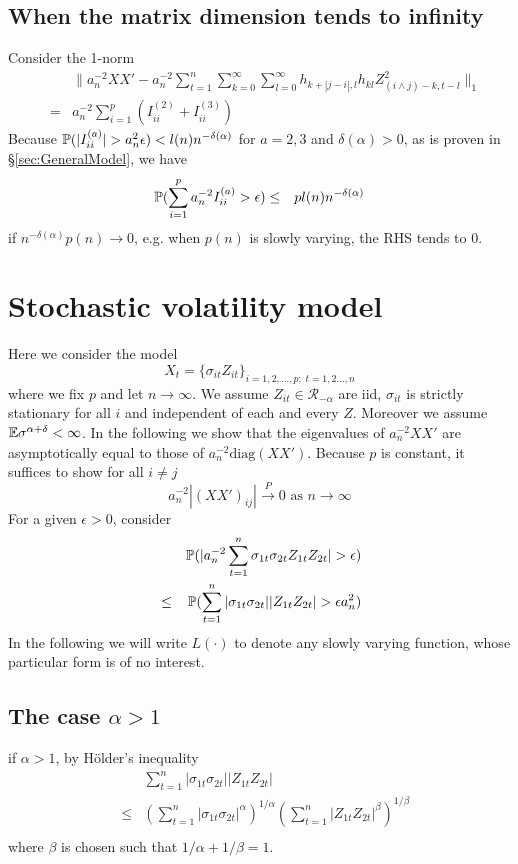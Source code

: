 \documentclass{article}
\begin{document}
\subsection{When the matrix dimension tends to infinity}
Consider the 1-norm
\begin{eqnarray*}
  && \| a_n^{-2} XX' - a_n^{-2} \sum_{t=1}^n
     \sum_{k=0}^\infty \sum_{l=0}^\infty
     h_{k+|j-i|,l} h_{kl} Z_{(i \wedge j) -k, t-l}^2\|_1 \\
  &=& a_n^{-2} \sum_{i=1}^p (I^{(2)}_{ii} + I^{(3)}_{ii})
\end{eqnarray*}
Because $\P(|I^{(a)}_{ii}| > a_n^2 \epsilon) < l(n)
n^{-\delta(\alpha)}$ for $a = 2,3$ and $\delta(\alpha) > 0$, as is
proven in \S\ref{sec:GeneralModel}, we have
\begin{eqnarray*}
  \P(\sum_{i=1}^p a_n^{-2} I^{(a)}_{ii} > \epsilon) &\leq& p l(n)
  n^{-\delta(\alpha)}
\end{eqnarray*}
if $n^{-\delta(\alpha)} p(n) \to 0$, e.g. when $p(n)$ is slowly varying, the RHS
tends to 0.

\section{Stochastic volatility model}
Here we consider the model
$$
X_t = \{\sigma_{it} Z_{it}\}_{i=1,2,\dots,p;\; t=1,2\dots,n}
$$
where we fix $p$ and let $n \to \infty$. We assume $Z_{it} \in
\mathcal R_{-\alpha}$ are iid, $\sigma_{it}$ is strictly stationary
for all $i$ and independent of each and every $Z$. Moreover we assume
$\E \sigma^{\alpha + \delta} < \infty$. In the following we show that
the eigenvalues of $a_n^{-2} XX'$ are asymptotically equal to those of
$a_n^{-2} \text{diag}(XX')$. Because $p$ is constant, it suffices to
show for all $i \neq j$
$$
a_n^{-2}|(XX')_{ij}| \overset{P}{\to} 0 \text{ as } n \to \infty
$$
For a given $\epsilon > 0$, consider
\begin{eqnarray*}
&& \P(|a_n^{-2} \sum_{t=1}^n \sigma_{1t}\sigma_{2t} Z_{1t} Z_{2t}| > \epsilon) \\
&\leq& \P(\sum_{t=1}^n | \sigma_{1t}\sigma_{2t} ||Z_{1t} Z_{2t}| > \epsilon a_n^{2}) \\ 
\end{eqnarray*}
In the following we will write $L(\cdot)$ to denote any slowly varying
function, whose particular form is of no interest.

\subsection[The case alpha > 1]{The case $\alpha > 1$}
if $\alpha > 1$, by H\"older's inequality
\begin{eqnarray*}
&& \sum_{t=1}^n | \sigma_{1t}\sigma_{2t} ||Z_{1t} Z_{2t}| \\
&\leq& \left(\sum_{t=1}^n |
  \sigma_{1t}\sigma_{2t}|^{\alpha}\right)^{1/\alpha} \left(
  \sum_{t=1}^n |Z_{1t} Z_{2t}|^{\beta}\right)^{1/\beta} \\
\end{eqnarray*}
where $\beta$ is chosen such that $1/\alpha + 1/\beta = 1$.
\end{document}

